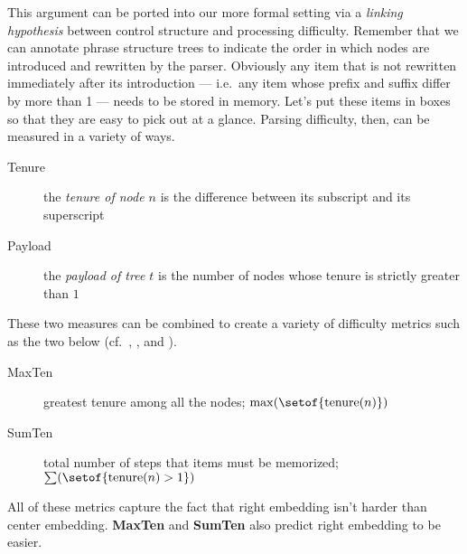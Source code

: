 This argument can be ported into our more formal setting via a \emph{linking hypothesis} between control structure and processing difficulty.
Remember that we can annotate phrase structure trees to indicate the order in which nodes are introduced and rewritten by the parser.
Obviously any item that is not rewritten immediately after its introduction --- i.e.\ any item whose prefix and suffix differ by more than 1 --- needs to be stored in memory.
Let's put these items in boxes so that they are easy to pick out at a glance.
Parsing difficulty, then, can be measured in a variety of ways.
%
\begin{description}
    \item[Tenure] the \emph{tenure of node $n$} is the difference between its subscript and its superscript
    \item[Payload] the \emph{payload of tree $t$} is the number of nodes whose tenure is strictly greater than $1$
\end{description}
%
These two measures can be combined to create a variety of difficulty metrics such as the two below (cf.\ \citealt{Kobele.etal12}, \citealt{GrafMarcinek14CMCL}, and \citealt{GrafEtAl15MOL}).
%
\begin{description}
    \item[MaxTen] greatest tenure among all the nodes; $\max(\setof{ \mathrm{tenure}(n) })$
    \item[SumTen] total number of steps that items must be memorized; $\sum(\setof{ \mathrm{tenure}(n) > 1})$
\end{description}
%
All of these metrics capture the fact that right embedding isn't harder than center embedding.
\textbf{MaxTen} and \textbf{SumTen} also predict right embedding to be easier.

